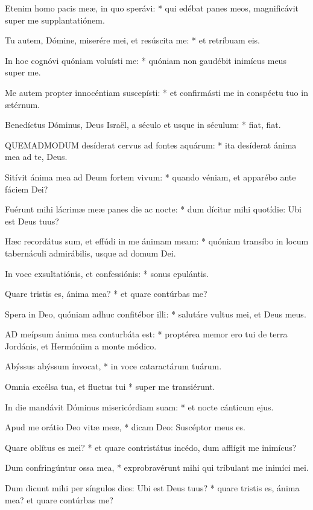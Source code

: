 Etenim homo pacis meæ, in quo sperávi: * qui edébat panes meos, magnificávit super me supplantatiónem.

Tu autem, Dómine, miserére mei, et resúscita me: * et retríbuam eis.

In hoc cognóvi quóniam voluísti me: * quóniam non gaudébit inimícus meus super me.

Me autem propter innocéntiam suscepísti: * et confirmásti me in conspéctu tuo in ætérnum.

Benedíctus Dóminus, Deus Israël, a século et usque in séculum: * fiat, fiat.


\lettrine[lines=2]{Q}{UEMADMODUM} desíderat cervus ad fontes aquárum: * ita desíderat ánima mea ad te, Deus.

Sitívit ánima mea ad Deum fortem vivum: * quando véniam, et apparébo ante fáciem Dei?

Fuérunt mihi lácrimæ meæ panes die ac nocte: * dum dícitur mihi quotídie: Ubi est Deus tuus?

Hæc recordátus sum, et effúdi in me ánimam meam: * quóniam transíbo in locum tabernáculi admirábilis, usque ad domum Dei.

In voce exsultatiónis, et confessiónis: * sonus epulántis.

Quare tristis es, ánima mea? * et quare contúrbas me?

Spera in Deo, quóniam adhuc confitébor illi: * salutáre vultus mei, et Deus meus.


\lettrine[lines=2]{A}{D} meípsum ánima mea conturbáta est: * proptérea memor ero tui de terra Jordánis, et Hermóniim a monte módico.

Abýssus abýssum ínvocat, * in voce cataractárum tuárum.

Omnia excélsa tua, et fluctus tui * super me transiérunt.

In die mandávit Dóminus misericórdiam suam: * et nocte cánticum ejus.

Apud me orátio Deo vitæ meæ, * dicam Deo: Suscéptor meus es.

Quare oblítus es mei? * et quare contristátus incédo, dum afflígit me inimícus?

Dum confringúntur ossa mea, * exprobravérunt mihi qui tríbulant me inimíci mei.

Dum dicunt mihi per síngulos dies: Ubi est Deus tuus? * quare tristis es, ánima mea? et quare contúrbas me?

